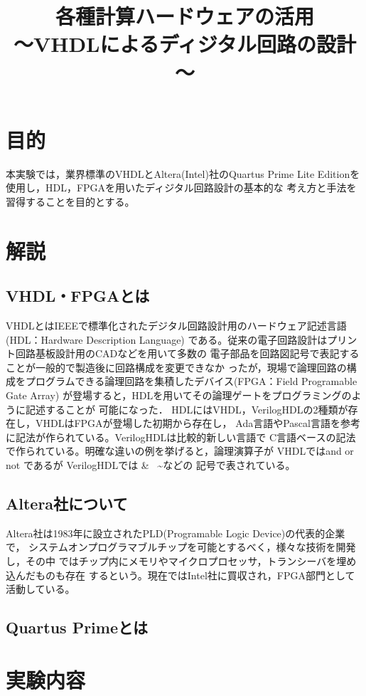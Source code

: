 \documentclass{ltjsarticle}
\title{各種計算ハードウェアの活用\\～VHDLによるディジタル回路の設計～}
\begin{document}
\maketitle

\section{目的}
本実験では，業界標準のVHDLとAltera(Intel)社のQuartus Prime Lite
Editionを使用し，HDL，FPGAを用いたディジタル回路設計の基本的な
考え方と手法を習得することを目的とする。
\section{解説}
	\subsection{VHDL・FPGAとは}
	VHDLとはIEEEで標準化されたデジタル回路設計用のハードウェア記述言語(HDL：Hardware Description Language)
	である。従来の電子回路設計はプリント回路基板設計用のCADなどを用いて多数の
	電子部品を回路図記号で表記することが一般的で製造後に回路構成を変更できなか
	ったが，現場で論理回路の構成をプログラムできる論理回路を集積したデバイス(FPGA：Field Programable Gate Array)
	が登場すると，HDLを用いてその論理ゲートをプログラミングのように記述することが
	可能になった．
	HDLにはVHDL，VerilogHDLの2種類が存在し，VHDLはFPGAが登場した初期から存在し，
	Ada言語やPascal言語を参考に記法が作られている。VerilogHDLは比較的新しい言語で
	C言語ベースの記法で作られている。明確な違いの例を挙げると，論理演算子が
	VHDLではand or not であるが VerilogHDLでは \& \textbar \, \textasciitilde などの
	記号で表されている。
	
	\subsection{Altera社について}
	Altera社は1983年に設立されたPLD(Programable Logic Device)の代表的企業で，
	システムオンプログラマブルチップを可能とするべく，様々な技術を開発し，その中
	ではチップ内にメモリやマイクロプロセッサ，トランシーバを埋め込んだものも存在
	するという。現在ではIntel社に買収され，FPGA部門として活動している。
	\subsection{Quartus Primeとは}
	

\section{実験内容}
\end{document}
